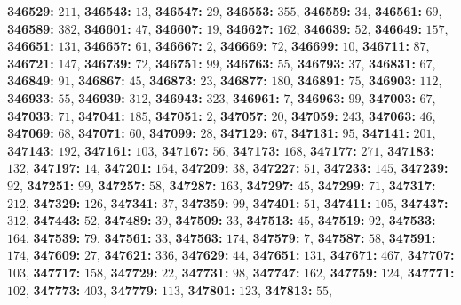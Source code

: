 \textsf{\bfseries 346529:} $211$, \textsf{\bfseries 346543:} $13$, \textsf{\bfseries 346547:} $29$, \textsf{\bfseries 346553:} $355$, \textsf{\bfseries 346559:} $34$, \textsf{\bfseries 346561:} $69$, \textsf{\bfseries 346589:} $382$, \textsf{\bfseries 346601:} $47$, \textsf{\bfseries 346607:} $19$, \textsf{\bfseries 346627:} $162$, \textsf{\bfseries 346639:} $52$, \textsf{\bfseries 346649:} $157$, \textsf{\bfseries 346651:} $131$, \textsf{\bfseries 346657:} $61$, \textsf{\bfseries 346667:} $2$, \textsf{\bfseries 346669:} $72$, \textsf{\bfseries 346699:} $10$, \textsf{\bfseries 346711:} $87$, \textsf{\bfseries 346721:} $147$, \textsf{\bfseries 346739:} $72$, \textsf{\bfseries 346751:} $99$, \textsf{\bfseries 346763:} $55$, \textsf{\bfseries 346793:} $37$, \textsf{\bfseries 346831:} $67$, \textsf{\bfseries 346849:} $91$, \textsf{\bfseries 346867:} $45$, \textsf{\bfseries 346873:} $23$, \textsf{\bfseries 346877:} $180$, \textsf{\bfseries 346891:} $75$, \textsf{\bfseries 346903:} $112$, \textsf{\bfseries 346933:} $55$, \textsf{\bfseries 346939:} $312$, \textsf{\bfseries 346943:} $323$, \textsf{\bfseries 346961:} $7$, \textsf{\bfseries 346963:} $99$, \textsf{\bfseries 347003:} $67$, \textsf{\bfseries 347033:} $71$, \textsf{\bfseries 347041:} $185$, \textsf{\bfseries 347051:} $2$, \textsf{\bfseries 347057:} $20$, \textsf{\bfseries 347059:} $243$, \textsf{\bfseries 347063:} $46$, \textsf{\bfseries 347069:} $68$, \textsf{\bfseries 347071:} $60$, \textsf{\bfseries 347099:} $28$, \textsf{\bfseries 347129:} $67$, \textsf{\bfseries 347131:} $95$, \textsf{\bfseries 347141:} $201$, \textsf{\bfseries 347143:} $192$, \textsf{\bfseries 347161:} $103$, \textsf{\bfseries 347167:} $56$, \textsf{\bfseries 347173:} $168$, \textsf{\bfseries 347177:} $271$, \textsf{\bfseries 347183:} $132$, \textsf{\bfseries 347197:} $14$, \textsf{\bfseries 347201:} $164$, \textsf{\bfseries 347209:} $38$, \textsf{\bfseries 347227:} $51$, \textsf{\bfseries 347233:} $145$, \textsf{\bfseries 347239:} $92$, \textsf{\bfseries 347251:} $99$, \textsf{\bfseries 347257:} $58$, \textsf{\bfseries 347287:} $163$, \textsf{\bfseries 347297:} $45$, \textsf{\bfseries 347299:} $71$, \textsf{\bfseries 347317:} $212$, \textsf{\bfseries 347329:} $126$, \textsf{\bfseries 347341:} $37$, \textsf{\bfseries 347359:} $99$, \textsf{\bfseries 347401:} $51$, \textsf{\bfseries 347411:} $105$, \textsf{\bfseries 347437:} $312$, \textsf{\bfseries 347443:} $52$, \textsf{\bfseries 347489:} $39$, \textsf{\bfseries 347509:} $33$, \textsf{\bfseries 347513:} $45$, \textsf{\bfseries 347519:} $92$, \textsf{\bfseries 347533:} $164$, \textsf{\bfseries 347539:} $79$, \textsf{\bfseries 347561:} $33$, \textsf{\bfseries 347563:} $174$, \textsf{\bfseries 347579:} $7$, \textsf{\bfseries 347587:} $58$, \textsf{\bfseries 347591:} $174$, \textsf{\bfseries 347609:} $27$, \textsf{\bfseries 347621:} $336$, \textsf{\bfseries 347629:} $44$, \textsf{\bfseries 347651:} $131$, \textsf{\bfseries 347671:} $467$, \textsf{\bfseries 347707:} $103$, \textsf{\bfseries 347717:} $158$, \textsf{\bfseries 347729:} $22$, \textsf{\bfseries 347731:} $98$, \textsf{\bfseries 347747:} $162$, \textsf{\bfseries 347759:} $124$, \textsf{\bfseries 347771:} $102$, \textsf{\bfseries 347773:} $403$, \textsf{\bfseries 347779:} $113$, \textsf{\bfseries 347801:} $123$, \textsf{\bfseries 347813:} $55$, 

